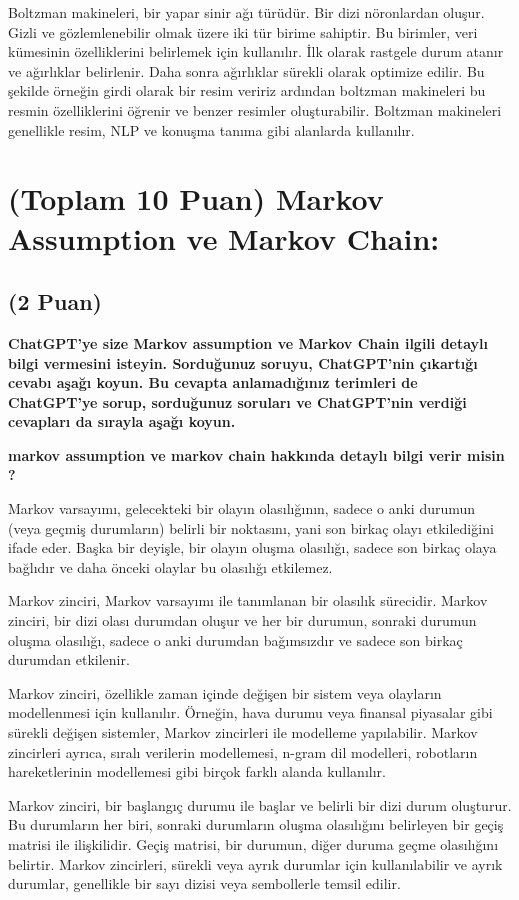 \documentclass[11pt]{article}
\begin{document}
Boltzman makineleri, bir yapar sinir ağı türüdür. Bir dizi nöronlardan oluşur.  Gizli ve gözlemlenebilir olmak üzere iki tür birime sahiptir. Bu birimler, veri kümesinin özelliklerini belirlemek için kullanılır. İlk olarak rastgele durum atanır ve ağırlıklar belirlenir. Daha sonra ağırlıklar sürekli olarak optimize edilir. Bu şekilde örneğin girdi olarak bir resim veririz ardından boltzman makineleri bu resmin özelliklerini öğrenir ve benzer resimler oluşturabilir. Boltzman makineleri genellikle resim, NLP ve konuşma tanıma gibi alanlarda kullanılır.

\section{(Toplam 10 Puan) Markov Assumption ve Markov Chain:}

\subsection{(2 Puan)} \textbf{ChatGPT’ye size Markov assumption ve Markov Chain ilgili detaylı bilgi vermesini isteyin. Sorduğunuz soruyu, ChatGPT'nin çıkartığı cevabı aşağı koyun. Bu cevapta anlamadığınız terimleri de ChatGPT’ye sorup, sorduğunuz soruları ve ChatGPT’nin verdiği cevapları da sırayla aşağı koyun.}

\textbf{markov assumption ve markov chain hakkında detaylı bilgi verir misin ?}


Markov varsayımı, gelecekteki bir olayın olasılığının, sadece o anki durumun (veya geçmiş durumların) belirli bir noktasını, yani son birkaç olayı etkilediğini ifade eder. Başka bir deyişle, bir olayın oluşma olasılığı, sadece son birkaç olaya bağlıdır ve daha önceki olaylar bu olasılığı etkilemez.

Markov zinciri, Markov varsayımı ile tanımlanan bir olasılık sürecidir. Markov zinciri, bir dizi olası durumdan oluşur ve her bir durumun, sonraki durumun oluşma olasılığı, sadece o anki durumdan bağımsızdır ve sadece son birkaç durumdan etkilenir.

Markov zinciri, özellikle zaman içinde değişen bir sistem veya olayların modellenmesi için kullanılır. Örneğin, hava durumu veya finansal piyasalar gibi sürekli değişen sistemler, Markov zincirleri ile modelleme yapılabilir. Markov zincirleri ayrıca, sıralı verilerin modellemesi, n-gram dil modelleri, robotların hareketlerinin modellemesi gibi birçok farklı alanda kullanılır.

Markov zinciri, bir başlangıç durumu ile başlar ve belirli bir dizi durum oluşturur. Bu durumların her biri, sonraki durumların oluşma olasılığını belirleyen bir geçiş matrisi ile ilişkilidir. Geçiş matrisi, bir durumun, diğer duruma geçme olasılığını belirtir. Markov zincirleri, sürekli veya ayrık durumlar için kullanılabilir ve ayrık durumlar, genellikle bir sayı dizisi veya sembollerle temsil edilir.
\end{document}

